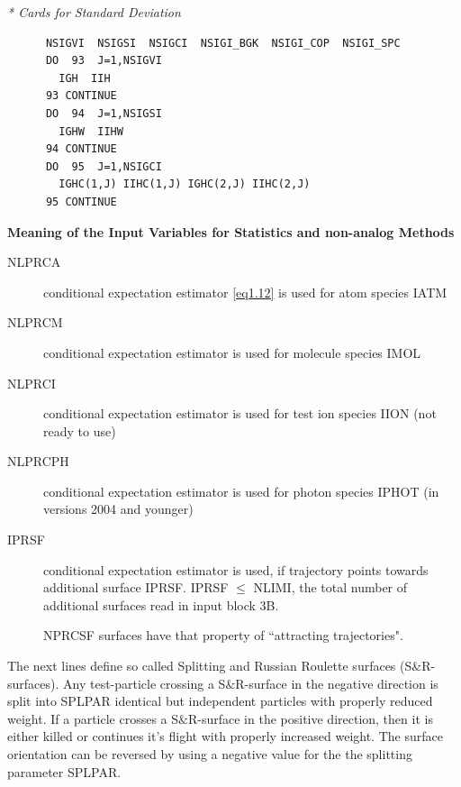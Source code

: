 \textsl{* Cards for Standard Deviation} 

\begin{lstlisting}
      NSIGVI  NSIGSI  NSIGCI  NSIGI_BGK  NSIGI_COP  NSIGI_SPC
      DO  93  J=1,NSIGVI
        IGH  IIH
      93 CONTINUE
      DO  94  J=1,NSIGSI
        IGHW  IIHW
      94 CONTINUE
      DO  95  J=1,NSIGCI
        IGHC(1,J) IIHC(1,J) IGHC(2,J) IIHC(2,J)
      95 CONTINUE
\end{lstlisting} 

\medskip 

\textbf{Meaning of the Input Variables for Statistics and non-analog Methods}

\medskip 

\begin{description}
  \item[NLPRCA] conditional expectation estimator
        \cref{eq1.12} is used for atom species IATM
  \item[NLPRCM] conditional
        expectation estimator is used for molecule species IMOL
  \item[NLPRCI]
        conditional expectation estimator is used for test ion species IION (not ready
        to use)
  \item[NLPRCPH] conditional expectation estimator is used for photon
        species IPHOT (in versions 2004 and younger)
  \item[IPRSF] conditional
        expectation estimator is used, if trajectory points towards additional surface
        IPRSF.
        IPRSF $\leq$ NLIMI, the total number of additional surfaces read in input block
        3B.

        NPRCSF surfaces have that property of ``attracting trajectories".
\end{description}
The next lines define so called Splitting and Russian Roulette surfaces
(S$\&$R-surfaces).
Any test-particle crossing a S$\&$R-surface in the negative direction is split
into SPLPAR identical but independent particles with properly reduced weight.
If a particle crosses a S$\&$R-surface in the positive direction, then it is
either killed or continues it's flight with properly increased weight.
The surface orientation can be reversed by using a negative value for the the
splitting parameter SPLPAR.
